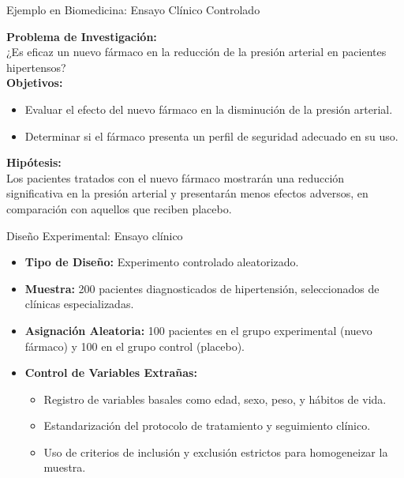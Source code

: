 ﻿\documentclass{beamer}
\begin{document}
\begin{frame}{Ejemplo en Biomedicina: Ensayo Clínico Controlado}
  
  \textbf{Problema de Investigación:}\\
  ¿Es eficaz un nuevo fármaco en la reducción de la presión arterial en pacientes hipertensos?\\[3mm]
  
  \textbf{Objetivos:}
  \begin{itemize}
      \item Evaluar el efecto del nuevo fármaco en la disminución de la presión arterial.
      \item Determinar si el fármaco presenta un perfil de seguridad adecuado en su uso.
  \end{itemize}
  
  \textbf{Hipótesis:}\\
  Los pacientes tratados con el nuevo fármaco mostrarán una reducción significativa en la presión arterial y presentarán menos efectos adversos, en comparación con aquellos que reciben placebo.
\end{frame}

\begin{frame}{Diseño Experimental: Ensayo clínico}
  \begin{itemize}
      \item \textbf{Tipo de Diseño:} Experimento controlado aleatorizado.
      \item \textbf{Muestra:} 200 pacientes diagnosticados de hipertensión, seleccionados de clínicas especializadas.
      \item \textbf{Asignación Aleatoria:} 100 pacientes en el grupo experimental (nuevo fármaco) y 100 en el grupo control (placebo).
      \item \textbf{Control de Variables Extrañas:}
      \begin{itemize}
          \item Registro de variables basales como edad, sexo, peso, y hábitos de vida.
          \item Estandarización del protocolo de tratamiento y seguimiento clínico.
          \item Uso de criterios de inclusión y exclusión estrictos para homogeneizar la muestra.
      \end{itemize}
  \end{itemize}
\end{frame}
\end{document}
